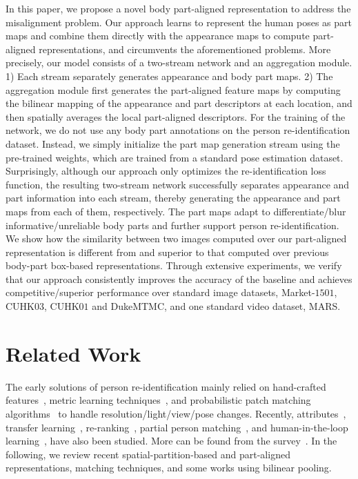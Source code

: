 \documentclass{llncs}
\begin{document}
In this paper, we propose a novel body part-aligned representation to address the misalignment problem. Our approach learns to represent the human poses as part maps and combine them directly with the appearance maps to compute part-aligned representations, and circumvents the aforementioned problems. More precisely, our model consists of a two-stream network and an aggregation module. 1) Each stream separately generates appearance and body part maps. 2) The aggregation module first generates the part-aligned feature maps by computing the bilinear mapping of the appearance and part descriptors at each location, and then spatially averages the local part-aligned descriptors. For the training of the network, we do not use any body part annotations on the person re-identification dataset. Instead, we simply initialize the part map generation stream using the pre-trained weights, which are trained from a standard pose estimation dataset. Surprisingly, although our approach only optimizes the re-identification loss function, the resulting two-stream network successfully separates appearance and part information into each stream, thereby generating the appearance and part maps from each of them, respectively. {\color{black}The part maps adapt to differentiate/blur informative/unreliable body parts} and further support person re-identification. We show how the similarity between two images computed over our part-aligned representation is different from and superior to that computed over previous body-part box-based representations. Through extensive experiments, we verify that our approach consistently improves the accuracy of the baseline and achieves competitive/superior performance over standard image datasets, Market-$1501$, CUHK$03$,  CUHK$01$ and DukeMTMC, and one standard video dataset, MARS.

\section{Related Work}
The early solutions of person re-identification mainly relied on hand-crafted features~\cite{ma2012local,LOMO2015,viewpoint2008,MatsukawaOSS16}, metric learning techniques~\cite{null2016,ZhangLLIR16,PaisitkriangkraiSV15,psd2015,KodirovXFG16,LiZWXG15,JingZWYKYHX15}, and probabilistic patch matching algorithms~\cite{dapeng2015,ChenYCZ16,correspondence2015} to handle resolution/light/view/pose changes. Recently, attributes~\cite{SuYZTDLG15,SuZX0T16,ZhaoOW14}, transfer learning~\cite{PengXWPGHT16,ShiHX15}, re-ranking~\cite{ZhengWTHLT15,GarciaMMG15},
partial person matching~\cite{ZhengLXLLG15}, and human-in-the-loop learning~\cite{MartinelDMR16,WangGZX16},
have also been studied. More can be found from the survey~\cite{ZhengYH16}.
In the following,
we review recent spatial-partition-based and part-aligned representations, matching techniques, 
and some works using bilinear pooling.
\end{document}
